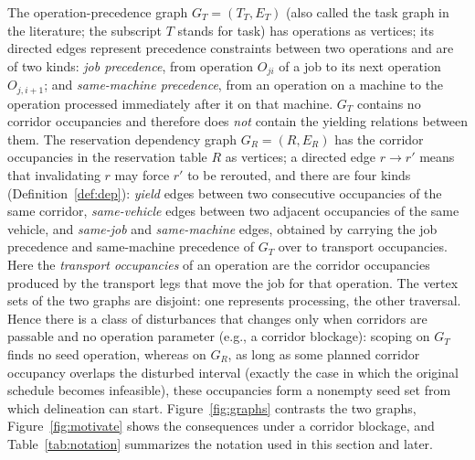 \documentclass[manuscript,screen,review]{acmart}
\begin{document}
The operation-precedence graph \(G_T=(T_T,E_T)\) (also called the task graph in the literature; the subscript \(T\) stands for task) has operations as vertices;
its directed edges represent precedence constraints between two operations and are of two kinds:
\emph{job precedence}, from operation \(O_{ji}\) of a job to its next operation \(O_{j,i+1}\);
and \emph{same-machine precedence}, from an operation on a machine to the operation processed immediately after it on that machine.
\(G_T\) contains no corridor occupancies and therefore does \emph{not} contain the yielding relations between them.
The reservation dependency graph \(G_R=(R,E_R)\) has the corridor occupancies in the reservation table \(R\) as vertices;
a directed edge \(r\to r'\) means that invalidating \(r\) may force \(r'\) to be rerouted, and there are four kinds (Definition~\ref{def:dep}):
\emph{yield} edges between two consecutive occupancies of the same corridor, \emph{same-vehicle} edges between two adjacent occupancies of the same vehicle,
and \emph{same-job} and \emph{same-machine} edges, obtained by carrying the job precedence and same-machine precedence of \(G_T\) over to transport occupancies.
Here the \emph{transport occupancies} of an operation are the corridor occupancies produced by the transport legs that move the job for that operation.
The vertex sets of the two graphs are disjoint: one represents processing, the other traversal.
Hence there is a class of disturbances that changes only when corridors are passable and no operation parameter (e.g., a corridor blockage):
scoping on \(G_T\) finds no seed operation,
whereas on \(G_R\), as long as some planned corridor occupancy overlaps the disturbed interval (exactly the case in which the original schedule becomes infeasible),
these occupancies form a nonempty seed set from which delineation can start.
Figure~\ref{fig:graphs} contrasts the two graphs, Figure~\ref{fig:motivate} shows the consequences under a corridor blockage, and
Table~\ref{tab:notation} summarizes the notation used in this section and later.
\end{document}

